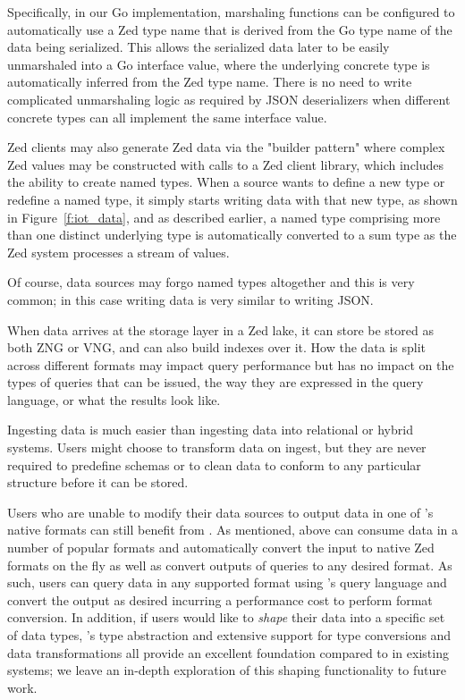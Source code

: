 Specifically, in our Go implementation, marshaling functions can be configured to automatically use a Zed type name that is derived from the Go type name of the data being serialized.  This allows the serialized data later to be easily unmarshaled into a Go interface value, where the underlying concrete type is automatically inferred from the Zed type name.  There is no need to write complicated unmarshaling logic as required by JSON deserializers when different concrete types can all implement the same interface value.

Zed clients may also generate Zed data via the "builder pattern" where complex Zed values may be constructed with calls to a Zed client library, which includes the ability to create named types. When a source wants to define a new type or redefine a named type, it simply starts writing data with that new type, as shown in Figure~\ref{f:iot_data}, and as described earlier, a named type comprising more than one distinct underlying type is automatically converted to a sum type as the Zed system processes a stream of values.

Of course, data sources may forgo named types altogether and this is very common; in this case writing \sys{} data is very similar to writing JSON.

When \sys{} data arrives at the storage layer in a Zed lake, it can store be stored as both ZNG or VNG, and can also build indexes over it. How the data is split across different formats may impact query performance but has no impact on the types of queries that can be issued, the way they are expressed in the query language, or what the results look like. 

Ingesting \sys{} data is much easier than ingesting data into relational or hybrid systems. Users might choose to transform data on ingest, but they are never required to predefine schemas or to clean data to conform to any particular structure before it can be stored.

Users who are unable to modify their data sources to output data in one of \sys{}'s native formats can still benefit from \sys{}.  As mentioned, above \sys{} can consume data in a number of popular formats and automatically convert the input to native Zed formats on the fly as well as convert outputs of queries to any desired format.  As such, users can query data in any supported format using \sys{}'s query language and convert the output as desired incurring a performance cost to perform format conversion. In addition, if users would like to {\em shape} their data into a specific set of data types, \sys{}'s type abstraction and extensive support for type conversions and data transformations all provide an excellent foundation compared to in existing systems; we leave an in-depth exploration of this shaping functionality to future work.

